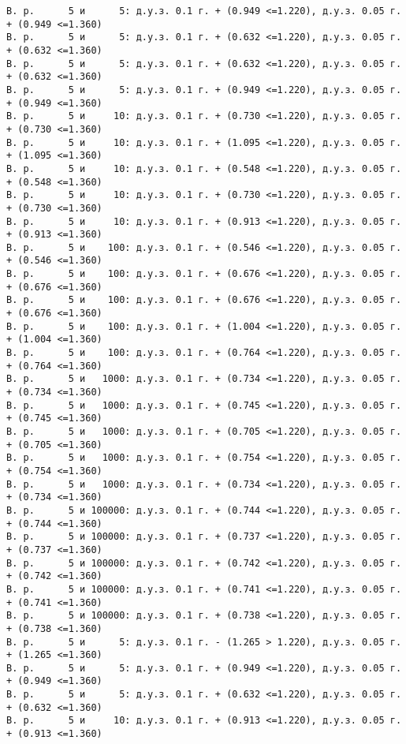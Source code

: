 \documentclass[11pt]{article}
\begin{document}
{\fontsize{8.85}{9}
    \begin{Verbatim}[commandchars=\\\{\}]
В. р.      5 и      5: д.у.з. 0.1 г. + (0.949 <=1.220), д.у.з. 0.05 г. + (0.949 <=1.360)
В. р.      5 и      5: д.у.з. 0.1 г. + (0.632 <=1.220), д.у.з. 0.05 г. + (0.632 <=1.360)
В. р.      5 и      5: д.у.з. 0.1 г. + (0.632 <=1.220), д.у.з. 0.05 г. + (0.632 <=1.360)
В. р.      5 и      5: д.у.з. 0.1 г. + (0.949 <=1.220), д.у.з. 0.05 г. + (0.949 <=1.360)
В. р.      5 и     10: д.у.з. 0.1 г. + (0.730 <=1.220), д.у.з. 0.05 г. + (0.730 <=1.360)
В. р.      5 и     10: д.у.з. 0.1 г. + (1.095 <=1.220), д.у.з. 0.05 г. + (1.095 <=1.360)
В. р.      5 и     10: д.у.з. 0.1 г. + (0.548 <=1.220), д.у.з. 0.05 г. + (0.548 <=1.360)
В. р.      5 и     10: д.у.з. 0.1 г. + (0.730 <=1.220), д.у.з. 0.05 г. + (0.730 <=1.360)
В. р.      5 и     10: д.у.з. 0.1 г. + (0.913 <=1.220), д.у.з. 0.05 г. + (0.913 <=1.360)
В. р.      5 и    100: д.у.з. 0.1 г. + (0.546 <=1.220), д.у.з. 0.05 г. + (0.546 <=1.360)
В. р.      5 и    100: д.у.з. 0.1 г. + (0.676 <=1.220), д.у.з. 0.05 г. + (0.676 <=1.360)
В. р.      5 и    100: д.у.з. 0.1 г. + (0.676 <=1.220), д.у.з. 0.05 г. + (0.676 <=1.360)
В. р.      5 и    100: д.у.з. 0.1 г. + (1.004 <=1.220), д.у.з. 0.05 г. + (1.004 <=1.360)
В. р.      5 и    100: д.у.з. 0.1 г. + (0.764 <=1.220), д.у.з. 0.05 г. + (0.764 <=1.360)
В. р.      5 и   1000: д.у.з. 0.1 г. + (0.734 <=1.220), д.у.з. 0.05 г. + (0.734 <=1.360)
В. р.      5 и   1000: д.у.з. 0.1 г. + (0.745 <=1.220), д.у.з. 0.05 г. + (0.745 <=1.360)
В. р.      5 и   1000: д.у.з. 0.1 г. + (0.705 <=1.220), д.у.з. 0.05 г. + (0.705 <=1.360)
В. р.      5 и   1000: д.у.з. 0.1 г. + (0.754 <=1.220), д.у.з. 0.05 г. + (0.754 <=1.360)
В. р.      5 и   1000: д.у.з. 0.1 г. + (0.734 <=1.220), д.у.з. 0.05 г. + (0.734 <=1.360)
В. р.      5 и 100000: д.у.з. 0.1 г. + (0.744 <=1.220), д.у.з. 0.05 г. + (0.744 <=1.360)
В. р.      5 и 100000: д.у.з. 0.1 г. + (0.737 <=1.220), д.у.з. 0.05 г. + (0.737 <=1.360)
В. р.      5 и 100000: д.у.з. 0.1 г. + (0.742 <=1.220), д.у.з. 0.05 г. + (0.742 <=1.360)
В. р.      5 и 100000: д.у.з. 0.1 г. + (0.741 <=1.220), д.у.з. 0.05 г. + (0.741 <=1.360)
В. р.      5 и 100000: д.у.з. 0.1 г. + (0.738 <=1.220), д.у.з. 0.05 г. + (0.738 <=1.360)
В. р.      5 и      5: д.у.з. 0.1 г. - (1.265 > 1.220), д.у.з. 0.05 г. + (1.265 <=1.360)
В. р.      5 и      5: д.у.з. 0.1 г. + (0.949 <=1.220), д.у.з. 0.05 г. + (0.949 <=1.360)
В. р.      5 и      5: д.у.з. 0.1 г. + (0.632 <=1.220), д.у.з. 0.05 г. + (0.632 <=1.360)
В. р.      5 и     10: д.у.з. 0.1 г. + (0.913 <=1.220), д.у.з. 0.05 г. + (0.913 <=1.360)

\end{Verbatim}}
\end{document}
